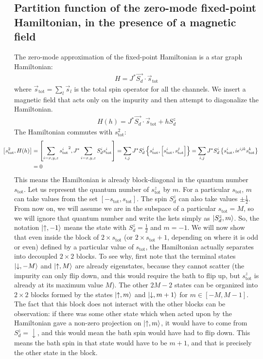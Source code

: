 \documentclass[10pt]{iopart}
\begin{document}
\subsection{Partition function of the zero-mode fixed-point Hamiltonian, in the presence of a magnetic field}
The zero-mode approximation of the fixed-point Hamiltonian is a star graph Hamiltonian:
\begin{eqnarray}
	H = J^* \vec{S_d}\cdot\vec{s}_\text{tot}
\end{eqnarray}
where \(\vec s_\text{tot} = \sum_l \vec s_l\) is the total spin operator for all the channels. We insert a magnetic field that acts only on the impurity and then attempt to diagonalize the Hamiltonian.
\begin{eqnarray}
	\label{stargraph_field_hamiltonian}
	H(h) = J^* \vec{S_d}\cdot\vec{s}_\text{tot} + h S_d^z
\end{eqnarray}
The Hamiltonian commutes with \(s_\text{tot}^2\):
\begin{eqnarray}
	\hspace*{-20pt}\left[s_\text{tot}^2, H(h)\right] &= \left[\sum_{i=x,y,z}{s^i_\text{tot}}^2, J^* \sum_{i=x,y,z} S_d^i s^i_\text{tot}\right] = \sum_{i,j}J^* S_d^i \left\{s_\text{tot}^i, \left[s_\text{tot}^i,s_\text{tot}^j\right]\right\} = \sum_{i,j}J^* S_d^i \left\{s_\text{tot}^i, i \epsilon^{ijk}s^k_\text{tot}\right\}\nonumber\\
							 &= 0
\end{eqnarray}
This means the Hamiltonian is already block-diagonal in the quantum number \(s_\text{tot}\). Let us represent the quantum number of \(s_\text{tot}^z\) by \(m\). For a particular \(s_\text{tot}\), \(m\) can take values from the set \(\left[-s_\text{tot}, s_\text{tot}\right] \). The spin \(S_d^z\) can also take values \(\pm \frac{1}{2}\). From now on, we will assume we are in the subspace of a particular \(s_\text{tot} = M\), so we will ignore that quantum number and write the kets simply as \(\ket{S_d^z, m}\). So, the notation \(\ket{\uparrow,-1}\) means the state with \(S_d^z = \frac{1}{2}\) and \(m = -1\). We will now show that even inside the block of \(2\times s_\text{tot}\) (or \(2\times s_\text{tot} + 1\), depending on where it is odd or even) defined by a particular value of \(s_\text{tot}\), the Hamiltonian actually separates into decoupled \(2\times 2\) blocks. To see why, first note that the terminal states \(\ket{\downarrow, -M}\) and \(\ket{\uparrow, M}\) are already eigenstates, because they cannot scatter (the impurity can only flip down, and this would require the bath to flip up, but \(s^z_\text{tot}\) is already at its maximum value \(M\)). The other \(2M - 2\) states can be organized into \(2\times 2\) blocks formed by the states \(\ket{\uparrow, m}\) and \(\ket{\downarrow, m+1}\) for \(m \in \left[-M, M-1\right] \). The fact that this block does not interact with the other blocks can be observation: if there was some other state which when acted upon by the Hamiltonian gave a non-zero projection on \(\ket{\uparrow, m}\), it would have to come from \(S_d^z = \downarrow\), and this would mean the bath spin would have had to flip down. This means the bath spin in that state would have to be \(m+1\), and that is precisely the other state in the block. 
\end{document}
